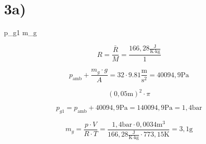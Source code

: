 

\section*{3a)}
 p_{g1} \quad m_g

\[
R = \frac{\bar{R}}{M} = \frac{166,28 \frac{\text{J}}{\text{K} \cdot \text{kg}}}{1}
\]

\[
p_{\text{amb}} + \frac{m_g \cdot g}{A} = 32 \cdot 9.81 \frac{\text{m}}{\text{s}^2} = 40 094,9 \text{Pa}
\]

\[
(0,05 \text{m})^2 \cdot \pi
\]

\[
p_{g1} = p_{\text{amb}} + 40 094,9 \text{Pa} = 140 094,9 \text{Pa} = 1,4 \text{bar}
\]

\[
m_g = \frac{p \cdot V}{R \cdot T} = \frac{1,4 \text{bar} \cdot 0,0034 \text{m}^3}{166,28 \frac{\text{J}}{\text{K} \cdot \text{kg}} \cdot 773,15 \text{K}} = 3,1 \text{g}
\]